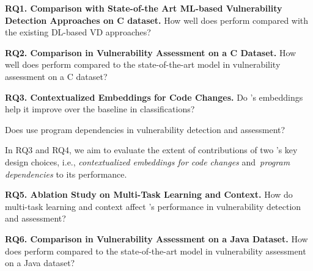 

\vspace{1pt}
\noindent\textbf{RQ1. Comparison with State-of-the Art ML-based Vulnerability
Detection Approaches on C dataset.} How well does {\tool} perform
compared with the existing DL-based VD approaches?

\vspace{1pt}
\noindent\textbf{RQ2. Comparison in Vulnerability Assessment on a C
  Dataset.} How well does {\tool} perform compared to the
state-of-the-art model in vulnerability assessment on a C dataset?


\noindent\textbf{RQ3. Contextualized Embeddings for Code Changes.} Do {\tool}'s embeddings help it improve over the
baseline in classifications?


 Does {\tool} use program dependencies in vulnerability detection and assessment?

In RQ3 and RQ4, we aim to evaluate the extent of contributions of two
  {\tool}'s key design choices, i.e., {\em contextualized embeddings
  for code changes} and~{\em program dependencies} to its performance.


\noindent\textbf{RQ5. Ablation Study on Multi-Task Learning and Context.} How do multi-task
learning and context affect {\tool}'s performance in vulnerability
detection and assessment?

\vspace{1pt}
\noindent\textbf{RQ6. Comparison in Vulnerability Assessment on a Java
  Dataset.} How does {\tool} perform compared to the
state-of-the-art model in vulnerability assessment on a Java dataset?


